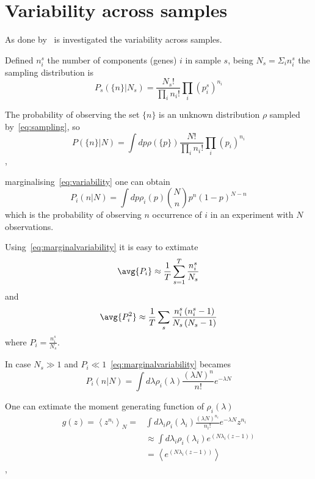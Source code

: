 \section{Variability across samples}
As done by~\cite{Grilli} is investigated the variability across samples.

Defined $n_i^s$ the number of components (genes) $i$ in sample $s$, being $N_s=\Sigma_i n_i^s$ 
the sampling distribution is
\begin{equation}\label{eq:sampling}
P_{s}\left(\{n\} | N_{s}\right)=\frac{N_{s}!}{\prod_{i}n_{i}!} \prod_{i}\left(p_{i}^{s}\right)^{n_{i}}
\end{equation}

The probability of observing the set $\{n\}$ is an unknown distribution $\rho$ 
sampled by~\ref{eq:sampling}, so
\begin{equation}\label{eq:variability}
P(\{n\}|N)=\int dp \rho(\{p\}) \frac{N!}{\prod_{i}n_{i}!} \prod_{i}\left(p_{i}\right)^{n_{i}}
\end{equation},

marginalising~\ref{eq:variability} one can obtain
\begin{equation}\label{eq:marginalvariability}
P_{i}(n | N)=\int dp \rho_{i}(p)\binom{N}{n}p^{n}(1-p)^{N-n}
\end{equation}
which is the probability of observing $n$ occurrence of $i$ in an experiment 
with $N$ observations.

Using~\ref{eq:marginalvariability} it is easy to extimate
\begin{equation}\label{eq:pimean}
  \avg{P_{i}} \approx \frac{1}{T} \sum_{s=1}^{T} \frac{n_{i}^{s}}{N_{s}}
\end{equation} and 
\begin{equation}\label{eq:pisquare}
  \avg{P_{i}^{2}}\approx \frac{1}{T} \sum_{s} \frac{n_{i}^{s}\left(n_{i}^{s}-1\right)}{N_{s}\left(N_{s}-1\right)}
\end{equation} 
where $P_i=\frac{n_i^s}{N_s}$.

In case $N_s\gg1$ and $P_i\ll1$~\ref{eq:marginalvariability} becames
\begin{equation}\label{eq:marginalvariabilitypoisson}
  P_{i}(n|N)=\int d \lambda \rho_{i}(\lambda) \frac{(\lambda N)^{n}}{n !} e^{-\lambda N}
\end{equation}

One can extimate the moment generating function of $\rho_i(\lambda)$
\begin{equation}\label{eq:momentgenfunc}
  \begin{aligned}
    g(z)=\left\langle z^{n_{i}}\right\rangle_{N}=&\int d\lambda_{i} \rho_{i}\left(\lambda_{i}\right) \frac{(\lambda N)^{n_i}}{n_i!} e^{-\lambda N} z^{n_{i}}\\
    &\approx \int d\lambda_{i} \rho_{i}\left(\lambda_{i}\right) e^{\left(N 
    \lambda_{i}(z-1)\right)}\\
    &=\left\langle e^{\left(N \lambda_{i}(z-1)\right)}\right\rangle
  \end{aligned}
\end{equation},

